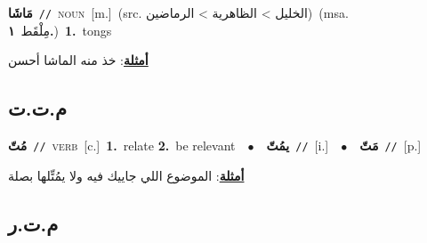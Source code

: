 \documentclass[10pt,a4paper,twoside]{article} %
\begin{document}
\begin{multicols}{2}
{{\setlength\topsep{0pt}\textbf{\foreignlanguage{arabic}{مَاشَا}}\ {\color{gray}\texttt{//}\color{black}}\ \textsc{noun}\ [m.]\ (src. \color{gray}\foreignlanguage{arabic}{الخليل > الظاهرية > الرماضين}\color{black})\ \color{gray}(msa. \foreignlanguage{arabic}{مِلْقَط}~\foreignlanguage{arabic}{\textbf{١.}})\color{black}\ \textbf{1.}~tongs\  \begin{flushright}\color{gray}\foreignlanguage{arabic}{\textbf{\underline{\foreignlanguage{arabic}{أمثلة}}}: خذ منه الماشا أحسن}\end{flushright}\color{black}} \vspace{2mm}

\vspace{-3mm}
\subsection*{\color{blue}\foreignlanguage{arabic}{م.ت.ت}\color{blue}{}} 

{\setlength\topsep{0pt}\textbf{\foreignlanguage{arabic}{مُتّ}}\ {\color{gray}\texttt{//}\color{black}}\ \textsc{verb}\ [c.]\ \textbf{1.}~relate  \textbf{2.}~be relevant\ \ $\bullet$\ \ \setlength\topsep{0pt}\textbf{\foreignlanguage{arabic}{يمُتّ}}\ {\color{gray}\texttt{//}\color{black}}\ [i.]\ \ $\bullet$\ \ \setlength\topsep{0pt}\textbf{\foreignlanguage{arabic}{مَتّ}}\ {\color{gray}\texttt{//}\color{black}}\ [p.]\  \begin{flushright}\color{gray}\foreignlanguage{arabic}{\textbf{\underline{\foreignlanguage{arabic}{أمثلة}}}: الموضوع اللي جاييك فيه ولا يمُتِّلها بصلة}\end{flushright}\color{black}} \vspace{2mm}

\vspace{-3mm}
\subsection*{\color{blue}\foreignlanguage{arabic}{م.ت.ر}\color{blue}{}} 

}
\end{multicols}
\end{document}
